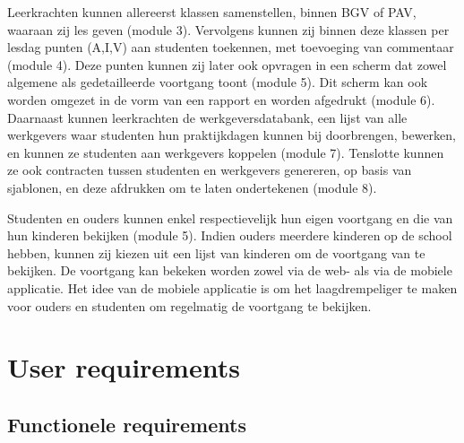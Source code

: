 \documentclass[a4paper]{article}
\begin{document}
Leerkrachten kunnen allereerst klassen samenstellen, binnen BGV of PAV, waaraan zij les geven (module 3). Vervolgens kunnen zij binnen deze klassen per lesdag punten (A,I,V) aan studenten toekennen, met toevoeging van commentaar (module 4). Deze punten kunnen zij later ook opvragen in een scherm dat zowel algemene als gedetailleerde voortgang toont (module 5). Dit scherm kan ook worden omgezet in de vorm van een rapport en worden afgedrukt (module 6). Daarnaast kunnen leerkrachten de werkgeversdatabank, een lijst van alle werkgevers waar studenten hun praktijkdagen kunnen bij doorbrengen, bewerken, en kunnen ze studenten aan werkgevers koppelen (module 7). Tenslotte kunnen ze ook contracten tussen studenten en werkgevers genereren, op basis van sjablonen, en deze afdrukken om te laten ondertekenen (module 8).

Studenten en ouders kunnen enkel respectievelijk hun eigen voortgang en die van hun kinderen bekijken (module 5). Indien ouders meerdere kinderen op de school hebben, kunnen zij kiezen uit een lijst van kinderen om de voortgang van te bekijken. De voortgang kan bekeken worden zowel via de web- als via de mobiele applicatie. Het idee van de mobiele applicatie is om het laagdrempeliger te maken voor ouders en studenten om regelmatig de voortgang te bekijken.



\newpage
\section{User requirements}  \label{sec:user_req}%
\subsection{Functionele requirements}
\end{document}
